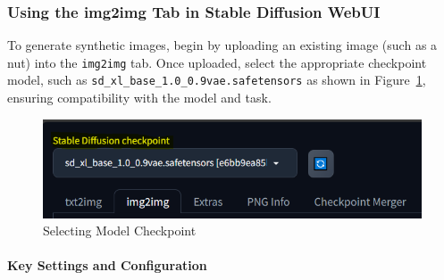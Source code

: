 \documentclass[12pt,DIV14,BCOR12mm,a4paper,footinclude=false,headinclude,parskip=half-,twoside,openright,cleardoublepage=empty,toc=index,bibliography=totoc,listof=totoc]{scrreprt}
\numberwithin{equation}{chapter}
\begin{document}
\subsubsection{Using the img2img Tab in Stable Diffusion WebUI}
To generate synthetic images, begin by uploading an existing image (such as a nut) into the \texttt{img2img} tab. Once uploaded, select the appropriate checkpoint model, such as \texttt{sd\_xl\_base\_1.0\_0.9vae.safetensors} as shown in Figure~\ref{checkpoint}, ensuring compatibility with the model and task.
\begin{figure}
	\centering
	\includegraphics[scale=.9]{../media/stable_diffusion_checkpoint.PNG}
	\caption{Selecting Model Checkpoint}
	\label{checkpoint}
\end{figure}

\paragraph{Key Settings and Configuration}
\end{document}
